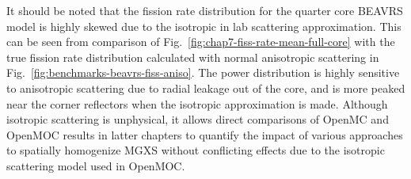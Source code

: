 It should be noted that the fission rate distribution for the quarter core \ac{BEAVRS} model is highly skewed due to the isotropic in lab scattering approximation. This can be seen from comparison of Fig.~\ref{fig:chap7-fiss-rate-mean-full-core} with the true fission rate distribution calculated with normal anisotropic scattering in Fig.~\ref{fig:benchmarks-beavrs-fiss-aniso}. The power distribution is highly sensitive to anisotropic scattering due to radial leakage out of the core, and is more peaked near the corner reflectors when the isotropic approximation is made. Although isotropic scattering is unphysical, it allows direct comparisons of OpenMC and OpenMOC results in latter chapters to quantify the impact of various approaches to spatially homogenize \ac{MGXS} without conflicting effects due to the isotropic scattering model used in OpenMOC.

